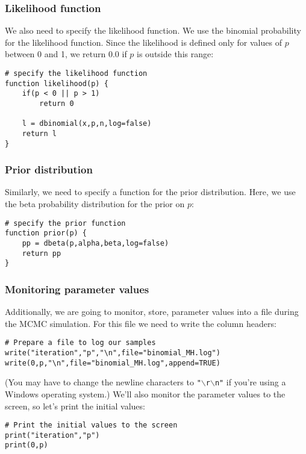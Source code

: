 \subsubsection{Likelihood function}
We also need to specify the likelihood function.
We use the binomial probability for the likelihood function. Since the likelihood is defined only for values of $p$ between 0 and 1, we return 0.0 if $p$ is outside this range:
{\tt \begin{snugshade*}
\begin{lstlisting}
# specify the likelihood function
function likelihood(p) {
    if(p < 0 || p > 1)
        return 0

    l = dbinomial(x,p,n,log=false)
    return l
}
\end{lstlisting}
\end{snugshade*}}

\subsubsection{Prior distribution}
Similarly, we need to specify a function for the prior distribution.
Here, we use the beta probability distribution for the prior on $p$:
{\tt \begin{snugshade*}
\begin{lstlisting}    
# specify the prior function
function prior(p) {
    pp = dbeta(p,alpha,beta,log=false)
    return pp
}
\end{lstlisting}
\end{snugshade*}}


\subsubsection{Monitoring parameter values}
Additionally, we are going to monitor, \IE store, parameter values into a file during the MCMC simulation.
For this file we need to write the column headers:
{\tt \begin{snugshade*}
\begin{lstlisting}
# Prepare a file to log our samples
write("iteration","p","\n",file="binomial_MH.log")
write(0,p,"\n",file="binomial_MH.log",append=TRUE)
\end{lstlisting}
\end{snugshade*}}
(You may have to change the newline characters to \texttt{"$\backslash$r$\backslash$n"} if you're using a Windows operating system.)
We'll also monitor the parameter values to the screen, so let's print the initial values:
{\tt \begin{snugshade*}
\begin{lstlisting}
# Print the initial values to the screen
print("iteration","p")
print(0,p)
\end{lstlisting}
\end{snugshade*}}

